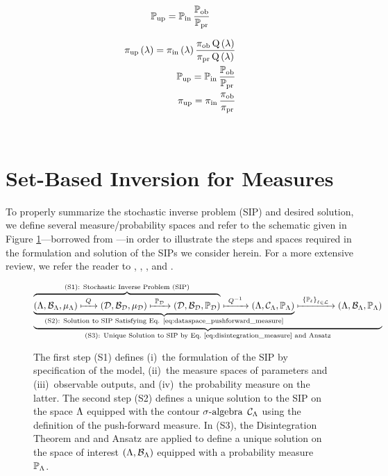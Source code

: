 \begin{equation}
\operatorname*{\mathbb{P}_{up}} = \operatorname*{\mathbb{P}_{in}} \frac{\operatorname*{\mathbb{P}_{ob}}}{\operatorname*{\mathbb{P}_{pr}}}
\end{equation}

\begin{equation}
\begin{split}
\operatorname*{\operatorname*{\pi_{up}}\operatorname*{\left ( \lambda \right )} = \operatorname*{\pi_{in}}\operatorname*{\left ( \lambda \right )} \frac{\operatorname*{\pi_{ob}}\operatorname*{\operatorname*{Q}\operatorname*{\left ( \lambda \right )}}}{\operatorname*{\pi_{pr}}\operatorname*{\operatorname*{Q}\operatorname*{\left ( \lambda \right )}}}}\\
\operatorname*{\operatorname*{\mathbb{P}_{up}} = \operatorname*{\mathbb{P}_{in}} \frac{\operatorname*{\mathbb{P}_{ob}}}{\operatorname*{\mathbb{P}_{pr}}}}\\
\operatorname*{\operatorname*{\pi_{up}} = \operatorname*{\pi_{in}} \frac{\operatorname*{\pi_{ob}}}{\operatorname*{\pi_{pr}}}}
\end{split}
\end{equation}

\
\section{Set-Based Inversion for Measures}

To properly summarize the stochastic inverse problem (SIP) and desired solution, we define several measure/probability spaces and refer to the schematic given in Figure \ref{fig:scheme}\----borrowed from \cite{BM17}\----in order to illustrate the steps and spaces required in the formulation and solution of the SIPs we consider herein.
For a more extensive review, we refer the reader to \cite{BBE11}, \cite{BES12}, \cite{BET+14}, and \cite{BM17}. 

\begin{figure}[!h]
\begin{equation}
\underbrace{
\underbrace{
\overbrace{ 
 (\Lambda, \mathcal{B}_{\Lambda}, \mu_{\Lambda}) \xmapsto{\  Q \ } (\mathcal{D}, \mathcal{B}_{\mathcal{D}}, \mu_{\mathcal{D}})
  \xmapsto{\ \mathbb{P}_{\mathcal{D}}\ } (\mathcal{D}, \mathcal{B}_{\mathcal{D}}, \mathbb{P}_{\mathcal{D}})
 }^{
 \text{(S1): Stochastic Inverse Problem (SIP)}
 }
 \xmapsto{\ Q^{-1} \ } (\Lambda, \mathcal{C}_\Lambda, \mathbb{P}_\Lambda)
 }_{
 \text{(S2): Solution to SIP Satisfying Eq. \eqref{eq:dataspace_pushforward_measure}}} 
 \xmapsto{\ \left\{\mathbb{P}_\ell\right\}_{\ell\in\mathcal{L}} \ } (\Lambda, \mathcal{B}_{\Lambda}, \mathbb{P}_\Lambda)
 }
 _{
 \text{(S3): Unique Solution to SIP by Eq.~\eqref{eq:disintegration_measure} and Ansatz}
 }
\end{equation}
\caption{The first step (S1) defines (i)~the formulation of the SIP by specification of the model, (ii)~the measure spaces of parameters and (iii)~observable outputs, and (iv)~the probability measure on the latter. The second step (S2) defines a unique solution to the SIP on the space $\Lambda$ equipped with the contour $\sigma\text{-algebra}$ $\mathcal{C}_\Lambda$ using the definition of the push-forward measure. In (S3), the Disintegration Theorem and and Ansatz are applied to define a unique solution on the space of interest $(\Lambda, \mathcal{B}_{\Lambda})$ equipped with a probability measure $\mathbb{P}_\Lambda$.}
\label{fig:scheme}
\end{figure}

